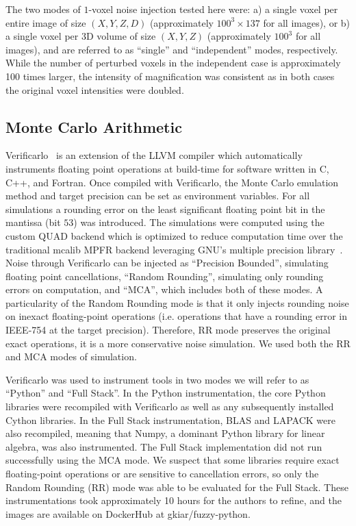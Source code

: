 \documentclass[fleqn,12pt]{SelfArx_ch} %
\begin{document}
The two modes of $1$-voxel noise injection tested here were: a) a single voxel per entire image of size $(X, Y, Z, D)$
(approximately $100^3 \times 137$ for all images), or b) a single voxel per $3$D volume of size $(X, Y, Z)$
(approximately $100^3$ for all images), and are referred to as ``single'' and ``independent'' modes, respectively.
While the number of perturbed voxels in the independent case is approximately 100 times larger, the intensity of
magnification was consistent as in both cases the original voxel intensities were doubled.

\subsection{Monte Carlo Arithmetic}
Verificarlo~\cite{Denis2016-wo} is an extension of the LLVM compiler which automatically instruments floating point
operations at build-time for software written in C, C++, and Fortran. Once compiled with Verificarlo, the Monte Carlo
emulation method and target precision can be set as environment variables. For all simulations a rounding error on the
least significant floating point bit in the mantissa (bit $53$) was introduced. The simulations were computed using the
custom QUAD backend which is optimized to reduce computation time over the traditional mcalib MPFR backend leveraging
GNU’s multiple precision library~\cite{Frechtling2015-cd}. Noise through Verificarlo can be injected as ``Precision
Bounded'', simulating floating point cancellations, ``Random Rounding'', simulating only rounding errors on
computation, and ``MCA'', which includes both of these modes. A particularity of the Random Rounding mode is that it
only injects rounding noise on inexact floating-point operations (i.e. operations that have a rounding error in
IEEE-754 at the target precision). Therefore, RR mode preserves the original exact operations, it is a more
conservative noise simulation. We used both the RR and MCA modes of simulation.

Verificarlo was used to instrument tools in two modes we will refer to as ``Python'' and ``Full Stack''. In the Python
instrumentation, the core Python libraries were recompiled with Verificarlo as well as any subsequently installed
Cython libraries. In the Full Stack instrumentation, BLAS and LAPACK were also recompiled, meaning that Numpy, a
dominant Python library for linear algebra, was also instrumented. The Full Stack implementation did not run
successfully using the MCA mode. We suspect that some libraries require exact floating-point operations or are
sensitive to cancellation errors, so only the Random Rounding (RR) mode was able to be evaluated for the Full Stack.
These instrumentations took approximately 10 hours for the authors to refine, and the images are available on DockerHub
at gkiar/fuzzy-python.
\end{document}
